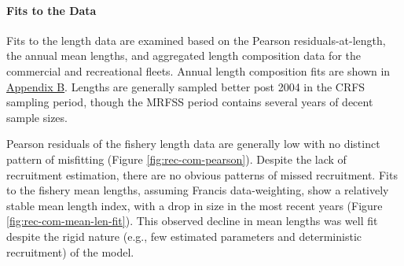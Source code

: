 \documentclass[11pt,
  english,
  a4paper,
]{article}
\begin{document}
\leavevmode\tagmcend\tagstructend\par


\hypertarget{fits-to-the-data}{%
\paragraph{Fits to the Data}\label{fits-to-the-data}}

\leavevmode\tagmcend\tagstructend


Fits to the length data are examined based on the Pearson residuals-at-length, the annual mean lengths, and aggregated length composition data for the commercial and recreational fleets. Annual length composition fits are shown in {\protect\hyperlink{append_a}{Appendix B}\leavevmode\tagmcend\tagstructend}. Lengths are generally sampled better post 2004 in the CRFS sampling period, though the MRFSS period contains several years of decent sample sizes.

\leavevmode\tagmcend\tagstructend\par


Pearson residuals of the fishery length data are generally low with no distinct pattern of misfitting (Figure \ref{fig:rec-com-pearson}). Despite the lack of recruitment estimation, there are no obvious patterns of missed recruitment. Fits to the fishery mean lengths, assuming Francis data-weighting, show a relatively stable mean length index, with a drop in size in the most recent years (Figure \ref{fig:rec-com-mean-len-fit}). This observed decline in mean lengths was well fit despite the rigid nature (e.g., few estimated parameters and deterministic recruitment) of the model.

\leavevmode\tagmcend\tagstructend\par

\end{document}
